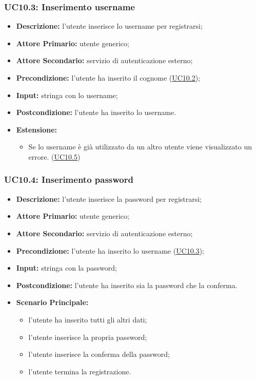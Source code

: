 \subsubsection{UC10.3: Inserimento username}
\label{sec:UC10.3}
\begin{itemize}
    \item \textbf{Descrizione:} l'utente inserisce lo username per registrarsi;
    \item \textbf{Attore Primario:} utente generico;
    \item \textbf{Attore Secondario:} servizio di autenticazione esterno;
    \item \textbf{Precondizione:} l'utente ha inserito il cognome (\hyperref[sec:UC10.2]{\underline{UC10.2}});
    \item \textbf{Input:} stringa con lo username;
    \item \textbf{Postcondizione:} l'utente ha inserito lo username.
    \item \textbf{Estensione:} 
    \begin{itemize}
        \item Se lo username è già utilizzato da un altro utente viene visualizzato un errore. (\hyperref[sec:UC10.5]{\underline{UC10.5}}) 
    \end{itemize} 
\end{itemize}

\subsubsection{UC10.4: Inserimento password}
\label{sec:UC10.4}
\begin{itemize}
    \item \textbf{Descrizione:} l'utente inserisce la password per registrarsi;
    \item \textbf{Attore Primario:} utente generico;
    \item \textbf{Attore Secondario:} servizio di autenticazione esterno;
    \item \textbf{Precondizione:} l'utente ha inserito lo username (\hyperref[sec:UC10.3]{\underline{UC10.3}});
    \item \textbf{Input:} stringa con la password;
    \item \textbf{Postcondizione:} l'utente ha inserito sia la password che la conferma.
    \item \textbf{Scenario Principale:}
        \begin{itemize}
            \item l'utente ha inserito tutti gli altri dati;
            \item l'utente inserisce la propria password;
            \item l'utente inserisce la conferma della password;
            \item l'utente termina la registrazione.
        \end{itemize} 
\end{itemize}

